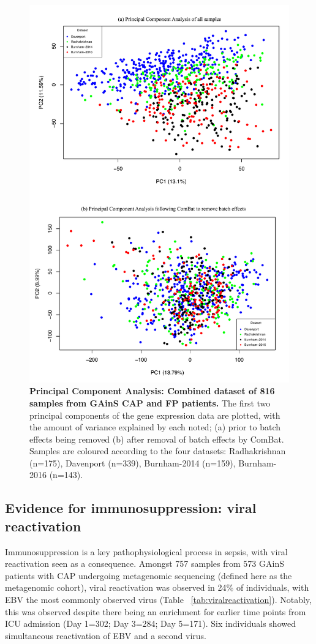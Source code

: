 \FloatBarrier
\begin{figure}[htbp]
\centering
\includegraphics[scale=0.7]{./Results3/Images/PCA_alldata.pdf}
\caption[Principal Component Analysis: Combined dataset]{\textbf{Principal Component Analysis: Combined dataset of 816 samples from GAinS CAP and FP patients.} The first two principal components of the gene expression data are plotted, with the amount of variance explained by each noted; (a) prior to batch effects being removed (b) after removal of batch effects by ComBat. Samples are coloured according to the four datasets: Radhakrishnan (n=175), Davenport (n=339), Burnham-2014 (n=159), Burnham-2016 (n=143).}
\label{fig:combat}
\end{figure}

\subsection{Evidence for immunosuppression: viral reactivation}
Immunosuppression is a key pathophysiological process in sepsis, with viral reactivation seen as a consequence. Amongst 757 samples from 573 GAinS patients with CAP undergoing metagenomic sequencing (defined here as the metagenomic cohort), viral reactivation was observed in 24\% of individuals, with EBV the most commonly observed virus (Table ~\ref{tab:viralreactivation}). Notably, this was observed despite there being an enrichment for earlier time points from ICU admission (Day 1=302; Day 3=284; Day 5=171). Six individuals showed simultaneous reactivation of EBV and a second virus. 

